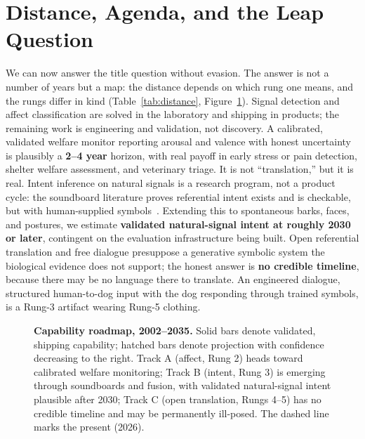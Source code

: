 \section{Distance, Agenda, and the Leap Question}
\label{sec:distance}
\label{sec:future}

We can now answer the title question without evasion. The answer is not a
number of years but a map: the distance depends on which rung one means, and
the rungs differ in kind (Table~\ref{tab:distance},
Figure~\ref{fig:roadmap}). Signal detection and affect classification are
solved in the laboratory and shipping in products; the remaining work is
engineering and validation, not discovery. A calibrated, validated welfare
monitor reporting arousal and valence with honest uncertainty is plausibly
a \textbf{2--4 year} horizon, with real payoff in early stress or pain
detection, shelter welfare assessment, and veterinary triage. It is not
``translation,'' but it is real. Intent inference on natural signals is a
research program, not a product cycle: the soundboard literature proves
referential intent exists and is checkable, but with human-supplied
symbols~\cite{bastos2024plos,bastos2024scirep}. Extending this to spontaneous
barks, faces, and postures, we estimate \textbf{validated natural-signal
intent at roughly 2030 or later}, contingent on the evaluation
infrastructure being built. Open referential translation and free dialogue
presuppose a generative symbolic system the biological evidence does not
support; the honest answer is \textbf{no credible timeline}, because there
may be no language there to translate. An engineered dialogue, structured
human-to-dog input with the dog responding through trained symbols, is a
Rung-3 artifact wearing Rung-5 clothing.

\begin{figure}[t]
\centering

\caption{\textbf{Capability roadmap, 2002--2035.} Solid bars denote
validated, shipping capability; hatched bars denote projection with
confidence decreasing to the right. Track A (affect, Rung 2) heads toward
calibrated welfare monitoring; Track B (intent, Rung 3) is emerging through
soundboards and fusion, with validated natural-signal intent plausible
after 2030; Track C (open translation, Rungs 4--5) has no credible timeline
and may be permanently ill-posed. The dashed line marks the present (2026).}
\label{fig:roadmap}
\end{figure}


